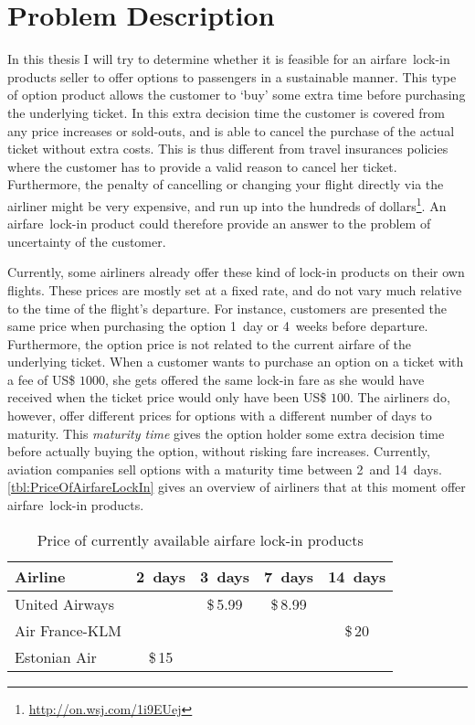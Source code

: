 \chapter{Problem Description}
\label{chap:ProblemDescription}
In this thesis I will try to determine whether it is feasible for an airfare~lock-in products seller to offer options to passengers in a sustainable manner. This type of option product allows the customer to `buy' some extra time before purchasing the underlying ticket. In this extra decision time the customer is covered from any price increases or sold-outs, and is able to cancel the purchase of the actual ticket without extra costs. This is thus different from travel insurances policies where the customer has to provide a valid reason to cancel her ticket. Furthermore, the penalty of cancelling or changing your flight directly via the airliner might be very expensive, and run up into the hundreds of dollars\footnote{\url{http://on.wsj.com/1i9EUej}}. An airfare~lock-in product could therefore provide an answer to the problem of uncertainty of the customer.

Currently, some airliners already offer these kind of lock-in products on their own flights. These prices are mostly set at a fixed rate, and do not vary much relative to the time of the flight's departure. For instance, customers are presented the same price when purchasing the option 1~day or 4~weeks before departure. Furthermore, the option price is not related to the current airfare of the underlying ticket. When a customer wants to purchase an option on a ticket with a fee of US\$ $1000$, she gets offered the same lock-in fare as she would have received when the ticket price would only have been US\$ $100$. The airliners do, however, offer different prices for options with a different number of days to maturity. This \emph{maturity time} gives the option holder some extra decision time before actually buying the option, without risking fare increases. Currently, aviation companies sell options with a maturity time between 2~and 14~days. \autoref{tbl:PriceOfAirfareLockIn} gives an overview of airliners that at this moment offer airfare~lock-in products.

\begin{table}
    \centering
    \begin{tabular}{l  c  c  c  c}
    \toprule
    Airline         & 2~days & 3~days   & 7~days   & 14~days  \\
    \midrule
    United Airways  &        & \$\,5.99 & \$\,8.99 &           \\
    Air France-KLM  &        &          &          & \$\,20    \\
    Estonian Air    & \$\,15 &          &          &           \\
    \bottomrule
    \end{tabular}
    \caption{Price of currently available airfare lock-in products}
    \label{tbl:PriceOfAirfareLockIn}
\end{table}

